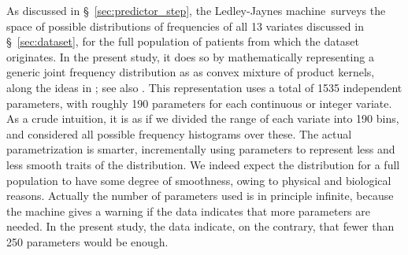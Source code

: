 \documentclass[utf8]{FrontiersinHarvard} %
\newcommand*{\wrench}{{\fontencoding{U}\fontfamily{fontawesomethree}\selectfont\symbol{114}}}
\newcommand*{\pencil}{{\fontencoding{U}\fontfamily{fontawesometwo}\selectfont\symbol{210}}}
\newcommand{\mynotew}[1]{{\color{notecolour}\wrench\ #1}}
\newcommand{\mynotep}[1]{{\color{notecolour}\pencil\ #1}}
\newcommand*{\sect}{\S}%
\newcommand*{\sects}{\S\S}%
\newcommand*{\chap}{ch.}%
\renewcommand*{\|}[1][]{\nonscript\:#1\vert\nonscript\:\mathopen{}}
\newcommand*{\ljm}{Ledley-Jaynes machine}
\begin{document}
As discussed in \sect~\ref{sec:predictor_step}, the \ljm\ surveys the space of possible distributions of frequencies of all 13 variates discussed in \sect~\ref{sec:dataset}, for the full population of patients from which the dataset originates. In the present study, it does so by mathematically representing a generic joint frequency distribution as as convex mixture of product kernels, along the ideas in \citet{dunsonetal2011}; see also \citet{rossi2014,rasmussen1999}. This representation uses a total of 1535 independent parameters, with roughly 190 parameters for each continuous or integer variate. As a crude intuition, it is as if we divided the range of each variate into 190 bins, and considered all possible frequency histograms over these. The actual parametrization is smarter, incrementally using parameters to represent less and less smooth traits of the distribution. We indeed expect the distribution for a full population to have some degree of smoothness, owing to physical and biological reasons. Actually the number of parameters used is in principle infinite, because the machine gives a warning if the data indicates that more parameters are needed. In the present study, the data indicate, on the contrary, that fewer than 250 parameters would be enough. 



\end{document}
